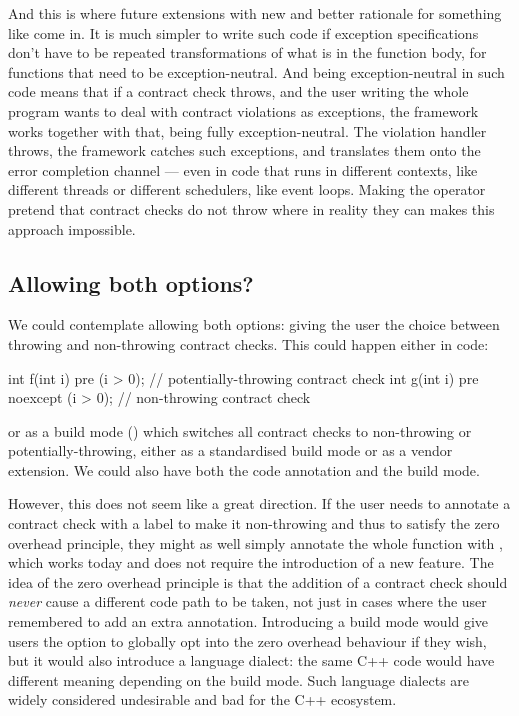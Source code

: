 And this is where future extensions with new and better rationale for something like  come in. It is much simpler to write such code if exception specifications don’t have to be repeated transformations of what is in the function body, for functions that need to be exception-neutral. And being exception-neutral in such code means that if a contract check throws, and the user writing the whole program wants to deal with contract violations as exceptions, the framework works together with that, being fully exception-neutral. The violation handler throws, the framework catches such exceptions, and translates them onto the error completion channel --- even in code that runs in different contexts, like different threads or different schedulers, like event loops. Making the  operator pretend that contract checks do not throw where in reality they can makes this approach impossible.

\subsection{Allowing both options?}

We could contemplate allowing both options: giving the user the choice between throwing and non-throwing contract checks. This could happen either in code:

\begin{codeblock}
int f(int i)
  pre (i > 0);  // potentially-throwing contract check
int g(int i)
  pre noexcept (i > 0);  // non-throwing contract check
\end{codeblock}

or as a build mode () which switches all contract checks to non-throwing or potentially-throwing, either as a standardised build mode or as a vendor extension. We could also have both the code annotation and the build mode.

However, this does not seem like a great direction. If the user needs to annotate a contract check with a  label to make it non-throwing and thus to satisfy the zero overhead principle, they might as well simply annotate the whole function with , which works today and does not require the introduction of a new feature. The idea of the zero overhead principle is that the addition of a contract check should \emph{never} cause a different code path to be taken, not just in cases where the user remembered to add an extra annotation. Introducing a build mode would give users the option to globally opt into the zero overhead behaviour if they wish, but it would also introduce a language dialect: the same C++ code would have different meaning depending on the build mode. Such language dialects are widely considered undesirable and bad for the C++ ecosystem.

